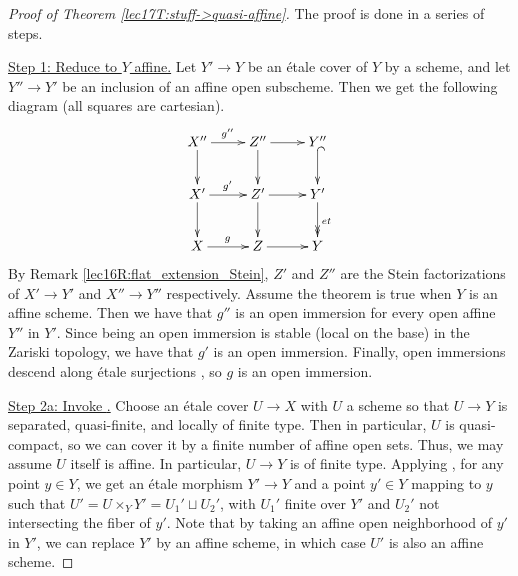  \begin{proof}[Proof of Theorem \ref{lec17T:stuff->quasi-affine}] The proof is done in a
   series of steps.

   \underline{Step 1: Reduce to $Y$ affine.} Let $Y'\to Y$ be an \'etale cover of $Y$ by
   a scheme, and let $Y''\to Y'$ be an inclusion of an affine open subscheme. Then we get
   the following diagram (all squares are cartesian).
   \[\xymatrix{
    X''\ar[r]^{g''}\ar[d] & Z''\ar[r]\ar[d] & Y''\ar@{^(->}[d]\\
    X' \ar[r]^{g'}\ar[d] & Z'\ar[r]\ar[d] & Y'\ar@{->>}[d]^{et}\\
    X\ar[r]^g & Z \ar[r] & Y
   }\]
    By Remark \ref{lec16R:flat_extension_Stein}, $Z'$ and $Z''$ are the Stein
   factorizations of $X'\to Y'$ and $X''\to Y''$ respectively. Assume the theorem is true
   when $Y$ is an affine scheme. Then we have that $g''$ is an open immersion for every
   open affine $Y''$ in $Y'$. Since being an open immersion is stable (local on the base)
   in the Zariski topology, we have that $g'$ is an open immersion. Finally, open
   immersions descend along \'etale surjections , so $g$
   is an open immersion.

   \underline{Step 2a: Invoke \cite[IV.18.12.3]{EGA}.} Choose an \'etale cover $U\to X$
   with $U$ a scheme so that $U\to Y$ is separated, quasi-finite, and locally of finite
   type. Then in particular, $U$ is quasi-compact, so we can cover it by a finite number
   of affine open sets. Thus, we may assume $U$ itself is affine. In particular, $U\to Y$
   is of finite type. Applying \cite[IV.18.12.3]{EGA}, for any point $y\in Y$, we get an
   \'etale morphism $Y'\to Y$ and a point $y'\in Y$ mapping to $y$ such that
   $U'=U\times_Y Y'=U_1'\sqcup U_2'$, with $U_1'$ finite over $Y'$ and $U_2'$ not
   intersecting the fiber of $y'$. Note that by taking an affine open neighborhood of
   $y'$ in $Y'$, we can replace $Y'$ by an affine scheme, in which case $U'$ is also an
   affine scheme.


\end{proof}
